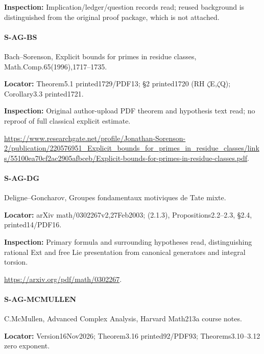 \documentclass[11pt,a4paper]{article}
\begin{document}
\textbf{Inspection:} Implication/\allowbreak{}ledger/\allowbreak{}question records read; reused background is distinguished from the original proof package, which is not attached.\allowbreak{}


\paragraph{S-AG-BS} Bach–\allowbreak{}Sorenson, Explicit bounds for primes in residue classes, Math.\allowbreak{}Comp.\allowbreak{}65(1996),1717–\allowbreak{}1735.

\textbf{Locator:} Theorem5.\allowbreak{}1 printed1729/\allowbreak{}PDF13; §2 printed1720 (RH \ensuremath{\zeta}E,\ensuremath{\zeta}Q); Corollary3.\allowbreak{}3 printed1721.

\textbf{Inspection:} Original author-upload PDF theorem and hypothesis text read; no reproof of full classical explicit estimate.\allowbreak{}

\url{https://www.researchgate.net/profile/Jonathan-Sorenson-2/publication/220576951_Explicit_bounds_for_primes_in_residue_classes/links/55100ea70cf2ac2905afbceb/Explicit-bounds-for-primes-in-residue-classes.pdf}.

\paragraph{S-AG-DG} Deligne–\allowbreak{}Goncharov, Groupes fondamentaux motiviques de Tate mixte.

\textbf{Locator:} arXiv math/\allowbreak{}0302267v2,27Feb2003; (2.\allowbreak{}1.\allowbreak{}3), Propositions2.\allowbreak{}2–\allowbreak{}2.\allowbreak{}3, §2.\allowbreak{}4, printed14/\allowbreak{}PDF16.

\textbf{Inspection:} Primary formula and surrounding hypotheses read, distinguishing rational Ext and free Lie presentation from canonical generators and integral torsion.\allowbreak{}

\url{https://arxiv.org/pdf/math/0302267}.

\paragraph{S-AG-MCMULLEN} C.\allowbreak{}McMullen, Advanced Complex Analysis, Harvard Math213a course notes.

\textbf{Locator:} Version16Nov2026; Theorem3.\allowbreak{}16 printed92/\allowbreak{}PDF93; Theorems3.\allowbreak{}10–\allowbreak{}3.\allowbreak{}12 zero exponent.
\end{document}
